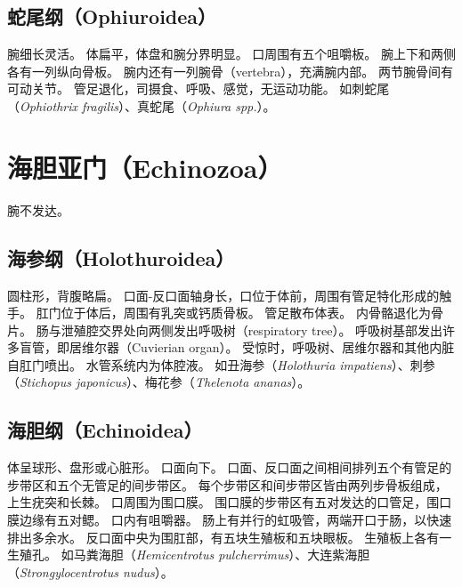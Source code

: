 \documentclass[11pt]{article}
\begin{document}
\subsection{蛇尾纲（Ophiuroidea）}
腕细长灵活。
体扁平，体盘和腕分界明显。
口周围有五个咀嚼板。
腕上下和两侧各有一列纵向骨板。
腕内还有一列腕骨（vertebra），充满腕内部。
两节腕骨间有可动关节。
管足退化，司摄食、呼吸、感觉，无运动功能。
如刺蛇尾（\textit{Ophiothrix fragilis}）、真蛇尾（\textit{Ophiura spp.}）。
  
\section{海胆亚门（Echinozoa）}
腕不发达。

\subsection{海参纲（Holothuroidea）}
圆柱形，背腹略扁。
口面-反口面轴身长，口位于体前，周围有管足特化形成的触手。
肛门位于体后，周围有乳突或钙质骨板。
管足散布体表。
内骨骼退化为骨片。
肠与泄殖腔交界处向两侧发出呼吸树（respiratory tree）。
呼吸树基部发出许多盲管，即居维尔器（Cuvierian organ）。
受惊时，呼吸树、居维尔器和其他内脏自肛门喷出。
水管系统内为体腔液。
如丑海参（\textit{Holothuria impatiens}）、刺参（\textit{Stichopus japonicus}）、梅花参（\textit{Thelenota ananas}）。

\subsection{海胆纲（Echinoidea）}
体呈球形、盘形或心脏形。
口面向下。
口面、反口面之间相间排列五个有管足的步带区和五个无管足的间步带区。
每个步带区和间步带区皆由两列步骨板组成，上生疣突和长棘。
口周围为围口膜。
围口膜的步带区有五对发达的口管足，围口膜边缘有五对鳃。
口内有咀嚼器。
肠上有并行的虹吸管，两端开口于肠，以快速排出多余水。
反口面中央为围肛部，有五块生殖板和五块眼板。
生殖板上各有一生殖孔。
如马粪海胆（\textit{Hemicentrotus pulcherrimus}）、大连紫海胆（\textit{Strongylocentrotus nudus}）。
\end{document}
